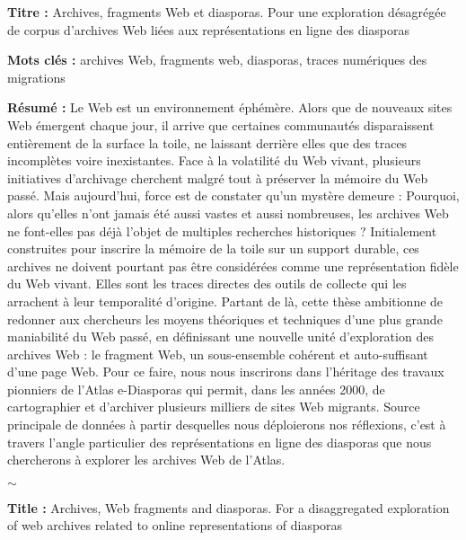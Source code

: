 \documentclass[symmetric,justified,marginals=raggedouter]{tufte-book}
\newcommand{\blankpage}{\newpage\hbox{}\thispagestyle{empty}\newpage}
\begin{document}
\blankpage

  
\newpage
\begin{fullwidth}
\thispagestyle{empty}
\setlength{\parskip}{\baselineskip}

\noindent\textbf{Titre :} Archives, fragments Web et diasporas. Pour une exploration désagrégée de corpus d'archives Web liées aux représentations en ligne des diasporas 

\noindent\textbf{Mots clés :} archives Web, fragments web, diasporas, traces numériques des migrations 

\noindent\textbf{Résumé :} Le Web est un environnement éphémère. Alors que de nouveaux sites Web émergent chaque jour, il arrive que certaines communautés disparaissent entièrement de la surface la toile, ne laissant derrière elles que des traces incomplètes voire inexistantes. Face à la volatilité du Web vivant, plusieurs initiatives d'archivage cherchent malgré tout à préserver la mémoire du Web passé. Mais aujourd'hui, force est de constater qu'un mystère demeure : Pourquoi, alors qu'elles n'ont jamais été aussi vastes et aussi nombreuses, les archives Web ne font-elles pas déjà l'objet de multiples recherches historiques ? Initialement construites pour inscrire la mémoire de la toile sur un support durable, ces archives ne doivent pourtant pas être considérées comme une représentation fidèle du Web vivant. Elles sont les traces directes des outils de collecte qui les arrachent à leur temporalité d'origine. Partant de là, cette thèse ambitionne de redonner aux chercheurs les moyens théoriques et techniques d'une plus grande maniabilité du Web passé, en définissant une nouvelle unité d'exploration des archives Web : le fragment Web, un sous-ensemble cohérent et auto-suffisant d'une page Web. Pour ce faire, nous nous inscrirons dans l'héritage des travaux pionniers de l'Atlas e-Diasporas qui permit, dans les années 2000, de cartographier et d'archiver plusieurs milliers de sites Web migrants. Source principale de données à partir desquelles nous déploierons nos réflexions, c'est à travers l'angle particulier des représentations en ligne des diasporas que nous chercherons à explorer les archives Web de l'Atlas.

\hspace*{21.5em}$\sim$

\noindent\textbf{Title :} Archives, Web fragments and diasporas. For a disaggregated exploration of web archives related to online representations of diasporas


\end{fullwidth}
\end{document}
